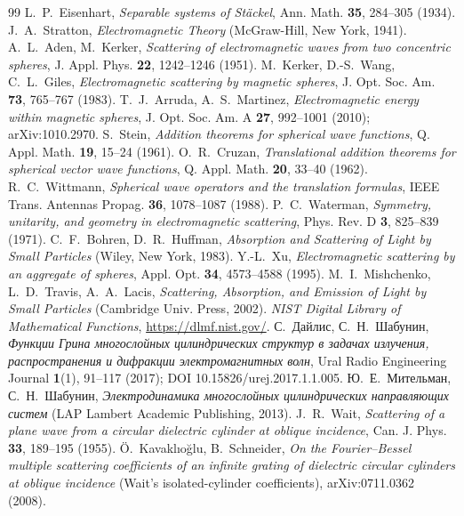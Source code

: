 \documentclass[11pt,a4paper]{article}
\begin{document}
\begin{thebibliography}{99}
 L.~P.~Eisenhart, \emph{Separable systems of St\"ackel}, Ann. Math. \textbf{35}, 284--305 (1934).
 J.~A.~Stratton, \emph{Electromagnetic Theory} (McGraw-Hill, New York, 1941).
 A.~L.~Aden, M.~Kerker, \emph{Scattering of electromagnetic waves from two concentric spheres}, J. Appl. Phys. \textbf{22}, 1242--1246 (1951).
 M.~Kerker, D.-S.~Wang, C.~L.~Giles, \emph{Electromagnetic scattering by magnetic spheres}, J. Opt. Soc. Am. \textbf{73}, 765--767 (1983).
 T.~J.~Arruda, A.~S.~Martinez, \emph{Electromagnetic energy within magnetic spheres}, J. Opt. Soc. Am. A \textbf{27}, 992--1001 (2010); arXiv:1010.2970.
 S.~Stein, \emph{Addition theorems for spherical wave functions}, Q. Appl. Math. \textbf{19}, 15--24 (1961).
 O.~R.~Cruzan, \emph{Translational addition theorems for spherical vector wave functions}, Q. Appl. Math. \textbf{20}, 33--40 (1962).
 R.~C.~Wittmann, \emph{Spherical wave operators and the translation formulas}, IEEE Trans. Antennas Propag. \textbf{36}, 1078--1087 (1988).
 P.~C.~Waterman, \emph{Symmetry, unitarity, and geometry in electromagnetic scattering}, Phys. Rev. D \textbf{3}, 825--839 (1971).
 C.~F.~Bohren, D.~R.~Huffman, \emph{Absorption and Scattering of Light by Small Particles} (Wiley, New York, 1983).
 Y.-L.~Xu, \emph{Electromagnetic scattering by an aggregate of spheres}, Appl. Opt. \textbf{34}, 4573--4588 (1995).
 M.~I.~Mishchenko, L.~D.~Travis, A.~A.~Lacis, \emph{Scattering, Absorption, and Emission of Light by Small Particles} (Cambridge Univ. Press, 2002).
 \emph{NIST Digital Library of Mathematical Functions}, \url{https://dlmf.nist.gov/}.
 С.~Дайлис, С.~Н.~Шабунин, \emph{Функции Грина многослойных цилиндрических структур в задачах излучения, распространения и дифракции электромагнитных волн}, Ural Radio Engineering Journal \textbf{1}(1), 91--117 (2017); DOI 10.15826/urej.2017.1.1.005.
 Ю.~Е.~Мительман, С.~Н.~Шабунин, \emph{Электродинамика многослойных цилиндрических направляющих систем} (LAP Lambert Academic Publishing, 2013).
 J.~R.~Wait, \emph{Scattering of a plane wave from a circular dielectric cylinder at oblique incidence}, Can. J. Phys. \textbf{33}, 189--195 (1955).
 Ö.~Kavaklıoğlu, B.~Schneider, \emph{On the Fourier--Bessel multiple scattering coefficients of an infinite grating of dielectric circular cylinders at oblique incidence} (Wait's isolated-cylinder coefficients), arXiv:0711.0362 (2008).
\end{thebibliography}
\end{document}
